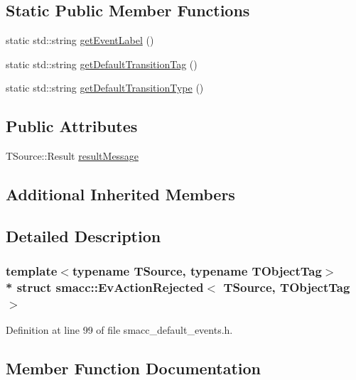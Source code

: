 \subsection*{Static Public Member Functions}
\begin{DoxyCompactItemize}
\item 
static std\+::string \hyperlink{structsmacc_1_1EvActionRejected_a51c9194f560d055a744e7c020af56838}{get\+Event\+Label} ()
\item 
static std\+::string \hyperlink{structsmacc_1_1EvActionRejected_aedef796db2cbdaed48a6f904c69e980b}{get\+Default\+Transition\+Tag} ()
\item 
static std\+::string \hyperlink{structsmacc_1_1EvActionRejected_a9ac258db0151f09b77d9ed65dbabfc31}{get\+Default\+Transition\+Type} ()
\end{DoxyCompactItemize}
\subsection*{Public Attributes}
\begin{DoxyCompactItemize}
\item 
T\+Source\+::\+Result \hyperlink{structsmacc_1_1EvActionRejected_a0236c082a2a408b48385f9aa0656af8c}{result\+Message}
\end{DoxyCompactItemize}
\subsection*{Additional Inherited Members}


\subsection{Detailed Description}
\subsubsection*{template$<$typename T\+Source, typename T\+Object\+Tag$>$\\*
struct smacc\+::\+Ev\+Action\+Rejected$<$ T\+Source, T\+Object\+Tag $>$}



Definition at line 99 of file smacc\+\_\+default\+\_\+events.\+h.



\subsection{Member Function Documentation}
